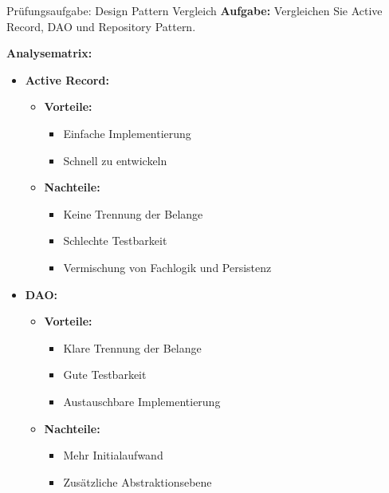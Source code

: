 \begin{example2}{Prüfungsaufgabe: Design Pattern Vergleich}
\textbf{Aufgabe:}
Vergleichen Sie Active Record, DAO und Repository Pattern.

\textbf{Analysematrix:}
\begin{itemize}
    \item \textbf{Active Record:}
    \begin{itemize}
        \item \textbf{Vorteile:}
        \begin{itemize}
            \item Einfache Implementierung
            \item Schnell zu entwickeln
        \end{itemize}
        \item \textbf{Nachteile:}
        \begin{itemize}
            \item Keine Trennung der Belange
            \item Schlechte Testbarkeit
            \item Vermischung von Fachlogik und Persistenz
        \end{itemize}
    \end{itemize}
    
    \item \textbf{DAO:}
    \begin{itemize}
        \item \textbf{Vorteile:}
        \begin{itemize}
            \item Klare Trennung der Belange
            \item Gute Testbarkeit
            \item Austauschbare Implementierung
        \end{itemize}
        \item \textbf{Nachteile:}
        \begin{itemize}
            \item Mehr Initialaufwand
            \item Zusätzliche Abstraktionsebene
        \end{itemize}
    \end{itemize}
    

\end{itemize}
\end{example2}
